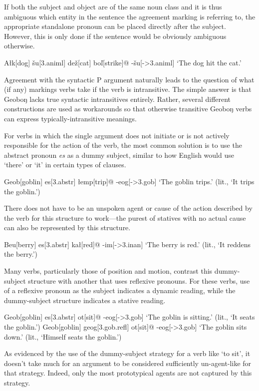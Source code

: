 \documentclass[a4paper,11pt,oneside,openany]{memoir}
\newcommand{\vz}{ž}
\newcommand{\vs}{š}
\newcommand{\vl}{ľ}
\newcommand{\engma}{ŋ}
\begin{document}
If both the subject and object are of the same noun class and it is thus ambiguous which entity in the sentence the agreement marking is referring to, the appropriate standalone pronoun can be placed directly after the subject. However, this is only done if the sentence would be obviously ambiguous otherwise.

\ex
\begingl
A\l k[dog]
\vs u[{\sc 3.animl}]
de{\vz}[cat]
bo\vl[strike]@
-\vs u[-{\sc >3.animl}]
\glft `The dog hit the cat.'
\endgl
\xe

Agreement with the syntactic P argument naturally leads to the question of what (if any) markings verbs take if the verb is intransitive. The simple answer is that Geobo{\engma} lacks true syntactic intransitives entirely. Rather, several different constructions are used as workarounds so that otherwise transitive Geobo{\engma} verbs can express typically-intransitive meanings.

For verbs in which the single argument does not initiate or is not actively responsible for the action of the verb, the most common solution is to use the abstract pronoun \textit{es} as a dummy subject, similar to how English would use `there' or `it' in certain types of clauses. 

\ex 
\begingl
Geob[goblin]
es[3.{\sc abstr}] 
\l emp[trip]@
-eog[-{\sc >3.gob}]
\glft `The goblin trips.' (lit., `It trips the goblin.')
\endgl
\xe

There does not have to be an unspoken agent or cause of the action described by the verb for this structure to work---the purest of statives with no actual cause can also be represented by this structure.

\ex
\begingl
Beu[berry]
es[{\sc 3.abstr}]
ka\l[red]@
-im[-{\sc >3.inan}]
\glft `The berry is red.' (lit., `It reddens the berry.')
\endgl
\xe

Many verbs, particularly those of position and motion, contrast this dummy-subject structure with another that uses reflexive pronouns. For these verbs, use of a reflexive pronoun as the subject indicates a dynamic reading, while the dummy-subject structure indicates a stative reading.

\pex
\a
\begingl
Geob[goblin]
es[{\sc 3.abstr}]
ot[sit]@
-eog[-{\sc >3.gob}]
\glft `The goblin is sitting.' (lit., `It seats the goblin.')
\endgl
\a
\begingl
Geob[goblin]
geog[{\sc 3.gob.refl}]
ot[sit]@
-eog[-{\sc >3.gob}]
\glft `The goblin sits down.' (lit., `Himself seats the goblin.')
\endgl
\xe

As evidenced by the use of the dummy-subject strategy for a verb like `to sit', it doesn't take much for an argument to be considered sufficiently un-agent-like for that strategy. Indeed, only the most prototypical agents are not captured by this strategy.
\end{document}
